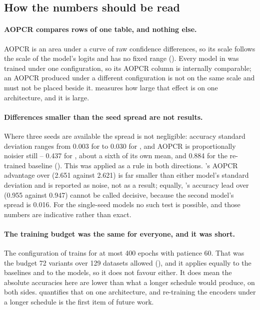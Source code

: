 \subsection{How the numbers should be read}
\label{sec:disc:reading}

\paragraph{AOPCR compares rows of one table, and nothing else.}
AOPCR is an area under a curve of raw confidence differences, so its scale follows the scale of the
model's logits and has no fixed range (). Every model in 
was trained under one configuration, so its AOPCR column is internally comparable; an AOPCR produced
under a different configuration is not on the same scale and must not be placed beside it.
 measures how large that effect is on one architecture, and it is large.

\paragraph{Differences smaller than the seed spread are not results.}
Where three seeds are available the spread is not negligible: accuracy standard deviation ranges
from 0.003 for \mgat{} to 0.030 for \minp{}, and AOPCR is proportionally noisier still -- 0.437 for
\minp{}, about a sixth of its own mean, and 0.884 for the re-trained \millet{} baseline
(). This was applied as a rule in both directions. \minp{}'s AOPCR advantage over
\mbot{} (2.651 against 2.621) is far smaller than either model's standard deviation and is reported
as noise, not as a result; equally, \mgat{}'s accuracy lead over \mbot{} (0.955 against 0.947) cannot
be called decisive, because the second model's spread is 0.016. For the single-seed models no such
test is possible, and those numbers are indicative rather than exact.

\paragraph{The training budget was the same for everyone, and it was short.}
The configuration of  trains for at most 400 epochs with patience 60. That was
the budget 72 variants over 129 datasets allowed (), and it applies equally to
the baselines and to the \seanet{} models, so it does not favour either. It does mean the absolute
accuracies here are lower than what a longer schedule would produce, on both sides.
 quantifies that on one architecture, and re-training the \seanet{} encoders
under a longer schedule is the first item of future work.

